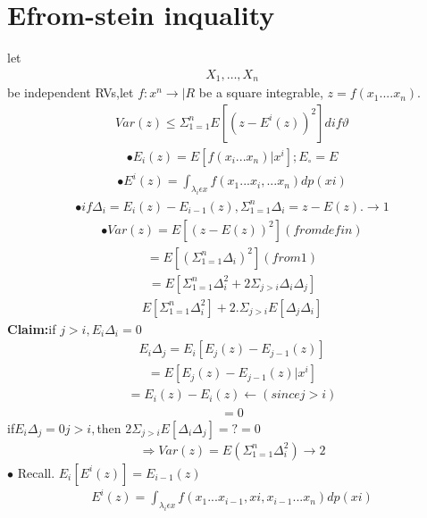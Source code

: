 \documentclass[journal,12pt,twocolumn]{IEEEtran}
\begin{document}
\section{Efrom-stein inquality}
let
\begin{align}
X_1, \dots, X_n
\end{align}
be independent RVs,let $f:x^n \rightarrow |R$ be a square integrable, $z=f(x_1....x_n).$
\begin{align}
Var(z) \leqslant \Sigma_{1=1}^{n} E[(z-E^i(z))^2] dif \vartheta
\end{align}
\begin{align}
\bullet E_i(z)=E[f(x_i...x_n)|x^i]; E_\circ=E
\end{align}
\begin{align}
\bullet E^i(z)= \int_{\lambda_i \epsilon x} f(x_1...x_i,...x_n)dp(xi)
\end{align}
\begin{align}
\bullet if \Delta_i=E_i(z)-E_{i-1}(z),\Sigma_{1=1}^{n} \Delta_i=z-E(z).\rightarrow 1
\end{align}
\begin{align}
\bullet Var(z)=E[(z-E(z))^2] (from defin)
\end{align}
\begin{align}
=E[(\Sigma_{1=1}^{n} \Delta_i)^2] (from 1)
\end{align}
\begin{align}
=E[\Sigma_{1=1}^{n} \Delta_i^2 +2\Sigma_{j>i} \Delta_i \Delta _j]
\end{align}
\begin{align}
E[\Sigma_{1=1}^{n} \Delta_i^2]+2.\Sigma_{j>i}E[\Delta_j \Delta_i]
\end{align}
\textbf{Claim:}if $j>i,E_i \Delta_i=0$
\begin{align}
E_i\Delta_j=E_i[E_j(z)-E_{j-1}(z)]
\end{align}
\begin{align}
=E[E_j(z)-E_{j-1}(z)|x^i]
\end{align}
\begin{align}
=E_i(z)-E_i(z)\leftarrow(since j>i)
\end{align}
\begin{align}
=0
\end{align}
if$E_i \Delta_j=0 j>i,$then $2\Sigma_{j>i}E[\Delta_i\Delta_j]=?=0$
\begin{align}
\Rightarrow Var(z)=E(\Sigma_{1=1}^{n} \Delta_i^2)\rightarrow2
\end{align}
$\bullet$ Recall. $E_i[E^i(z)]=E_{i-1}(z)$
\begin{align}
E^i(z)=\int_{\lambda_i \epsilon x}f(x_1...x_{i-1},xi,x_{i-1}...x_n)dp(xi)
\end{align}
\end{document}
